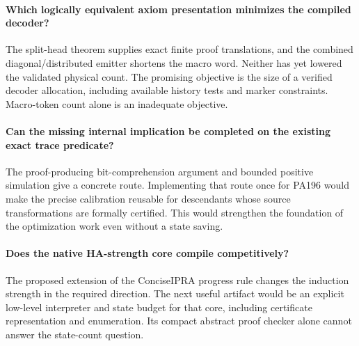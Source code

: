 \documentclass[11pt,letterpaper]{article}
\begin{document}
\paragraph{Which logically equivalent axiom presentation minimizes the
compiled decoder?}
The split-head theorem supplies exact finite proof translations, and the
combined diagonal/distributed emitter shortens the macro word. Neither
has yet lowered the validated physical count. The promising objective
is the size of a verified decoder allocation, including available
history tests and marker constraints. Macro-token count alone is an
inadequate objective.

\paragraph{Can the missing internal implication be completed on the
existing exact trace predicate?}
The proof-producing bit-comprehension argument and bounded positive
simulation give a concrete route. Implementing that route once for
PA196 would make the precise calibration reusable for descendants whose
source transformations are formally certified. This would strengthen
the foundation of the optimization work even without a state saving.

\paragraph{Does the native HA-strength core compile competitively?}
The proposed extension of the ConciseIPRA progress rule changes the
induction strength in the required direction. The next useful artifact
would be an explicit low-level interpreter and state budget for that
core, including certificate representation and enumeration. Its compact
abstract proof checker alone cannot answer the state-count question.
\end{document}
